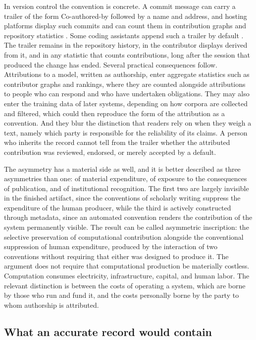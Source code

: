 \documentclass[12pt]{article}
\theoremstyle{definition}
\theoremstyle{plain}
\begin{document}
In version control the convention is concrete. A commit message can carry a trailer of the form Co-authored-by followed by a name and address, and hosting platforms display such commits and can count them in contribution graphs and repository statistics \cite{github-coauthors}. Some coding assistants append such a trailer by default \cite{flyxion-credit}. The trailer remains in the repository history, in the contributor displays derived from it, and in any statistic that counts contributions, long after the session that produced the change has ended. Several practical consequences follow. Attributions to a model, written as authorship, enter aggregate statistics such as contributor graphs and rankings, where they are counted alongside attributions to people who can respond and who have undertaken obligations. They may also enter the training data of later systems, depending on how corpora are collected and filtered, which could then reproduce the form of the attribution as a convention. And they blur the distinction that readers rely on when they weigh a text, namely which party is responsible for the reliability of its claims. A person who inherits the record cannot tell from the trailer whether the attributed contribution was reviewed, endorsed, or merely accepted by a default.

The asymmetry has a material side as well, and it is better described as three asymmetries than one: of material expenditure, of exposure to the consequences of publication, and of institutional recognition. The first two are largely invisible in the finished artifact, since the conventions of scholarly writing suppress the expenditure of the human producer, while the third is actively constructed through metadata, since an automated convention renders the contribution of the system permanently visible. The result can be called asymmetric inscription: the selective preservation of computational contribution alongside the conventional suppression of human expenditure, produced by the interaction of two conventions without requiring that either was designed to produce it. The argument does not require that computational production be materially costless. Computation consumes electricity, infrastructure, capital, and human labor. The relevant distinction is between the costs of operating a system, which are borne by those who run and fund it, and the costs personally borne by the party to whom authorship is attributed.

\subsection{What an accurate record would contain}
\end{document}

